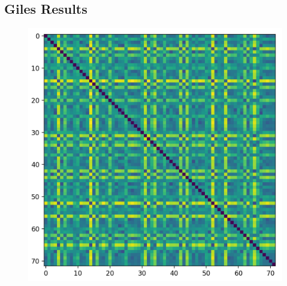 \documentclass{article}
\begin{document}
\subsection{Giles Results}
\begin{figure}
    \includegraphics[width=\textwidth]{images/head-distance-matrix.png}
\end{figure}
\end{document}
